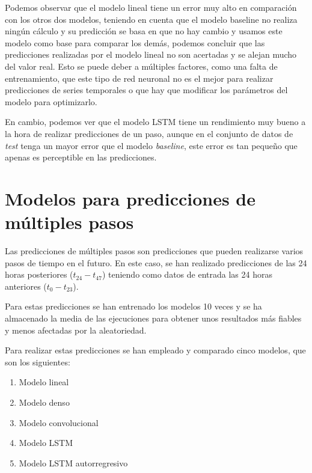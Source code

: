 Podemos observar que el modelo lineal tiene un error muy alto en comparación con los otros dos modelos, teniendo en cuenta que el modelo baseline no realiza ningún cálculo y su predicción se basa en que no hay cambio y usamos este modelo como base para comparar los demás, podemos concluir que las predicciones realizadas por el modelo lineal no son acertadas y se alejan mucho del valor real. Esto se puede deber a múltiples factores, como una falta de entrenamiento, que este tipo de red neuronal no es el mejor para realizar predicciones de series temporales o que hay que modificar los parámetros del modelo para optimizarlo.

\par

En cambio, podemos ver que el modelo LSTM tiene un rendimiento muy bueno a la hora de realizar predicciones de un paso, aunque en el conjunto de datos de \textit{test} tenga un mayor error que el modelo \textit{baseline}, este error es tan pequeño que apenas es perceptible en las predicciones.

\section{Modelos para predicciones de múltiples pasos}

Las predicciones de múltiples pasos son predicciones que pueden realizarse varios pasos de tiempo en el futuro. En este caso, se han realizado predicciones de las 24 horas posteriores ($t_{24}-t_{47}$) teniendo como datos de entrada las 24 horas anteriores ($t_0-t_{23}$).

\par

Para estas predicciones se han entrenado los modelos 10 veces y se ha almacenado la media de las ejecuciones para obtener unos resultados más fiables y menos afectadas por la aleatoriedad.


\par

Para realizar estas predicciones se han empleado y comparado cinco modelos, que son los siguientes:

\begin{enumerate}
    \item Modelo lineal
    \item Modelo denso
    \item Modelo convolucional
    \item Modelo LSTM
    \item Modelo LSTM autorregresivo
\end{enumerate}

